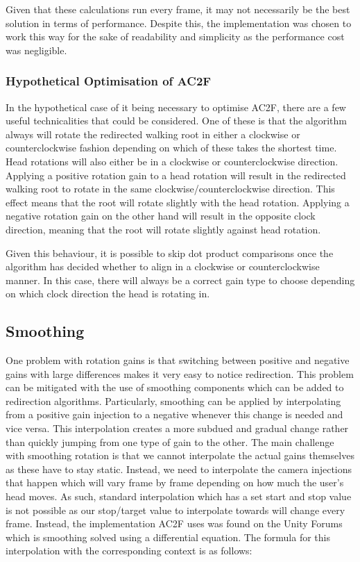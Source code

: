 Given that these calculations run every frame, it may not necessarily be the best solution in terms of performance. Despite this, the implementation was chosen to work this way for the sake of readability and simplicity as the performance cost was negligible. 

\subsubsection{Hypothetical Optimisation of AC2F}
In the hypothetical case of it being necessary to optimise AC2F, there are a few useful technicalities that could be considered. One of these is that the algorithm always will rotate the redirected walking root in either a clockwise or counterclockwise fashion depending on which of these takes the shortest time. Head rotations will also either be in a clockwise or counterclockwise direction. Applying a positive rotation gain to a head rotation will result in the redirected walking root to rotate in the same clockwise/counterclockwise direction. This effect means that the root will rotate slightly with the head rotation. Applying a negative rotation gain on the other hand will result in the opposite clock direction, meaning that the root will rotate slightly against head rotation. 

Given this behaviour, it is possible to skip dot product comparisons once the algorithm has decided whether to align in a clockwise or counterclockwise manner. In this case, there will always be a correct gain type to choose depending on which clock direction the head is rotating in.

\subsection{Smoothing}
One problem with rotation gains is that switching between positive and negative gains with large differences makes it very easy to notice redirection. This problem can be mitigated with the use of smoothing components which can be added to redirection algorithms. Particularly, smoothing can be applied by interpolating from a positive gain injection to a negative whenever this change is needed and vice versa. This interpolation creates a more subdued and gradual change rather than quickly jumping from one type of gain to the other. The main challenge with smoothing rotation is that we cannot interpolate the actual gains themselves as these have to stay static. Instead, we need to interpolate the camera injections that happen which will vary frame by frame depending on how much the user's head moves. As such, standard interpolation which has a set start and stop value is not possible as our stop/target value to interpolate towards will change every frame. Instead, the implementation AC2F uses was found on the Unity Forums~\cite{smoothingFormula} which is smoothing solved using a differential equation. The formula for this interpolation with the corresponding context is as follows:

